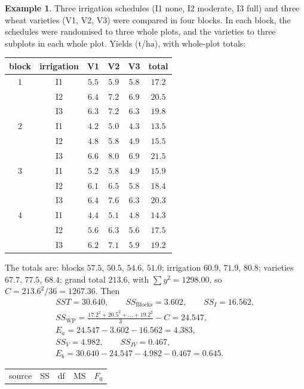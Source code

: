 \documentclass[11pt,a4paper]{article}
\numberwithin{equation}{section}
\theoremstyle{definition}
\newtheorem{exa}[thm]{Example}
\begin{document}
\begin{exa}\label{exa:irrigation}
Three irrigation schedules (I1 none, I2 moderate, I3 full) and three wheat varieties (V1, V2, V3) were compared in four blocks. In each block, the
schedules were randomised to three whole plots, and the varieties to three subplots in each whole plot. Yields (t/ha), with whole-plot totals:
\begin{center}
\begin{tabular}{cc|ccc|c}
block & irrigation & V1 & V2 & V3 & total \\
\hline
$1$ & I1 & $5.5$ & $5.9$ & $5.8$ & $17.2$ \\
& I2 & $6.4$ & $7.2$ & $6.9$ & $20.5$ \\
& I3 & $6.3$ & $7.2$ & $6.3$ & $19.8$ \\
\hline
$2$ & I1 & $4.2$ & $5.0$ & $4.3$ & $13.5$ \\
& I2 & $4.8$ & $5.8$ & $4.9$ & $15.5$ \\
& I3 & $6.6$ & $8.0$ & $6.9$ & $21.5$ \\
\hline
$3$ & I1 & $5.2$ & $5.8$ & $4.9$ & $15.9$ \\
& I2 & $6.1$ & $6.5$ & $5.8$ & $18.4$ \\
& I3 & $6.4$ & $7.6$ & $6.3$ & $20.3$ \\
\hline
$4$ & I1 & $4.4$ & $5.1$ & $4.8$ & $14.3$ \\
& I2 & $5.6$ & $6.3$ & $5.6$ & $17.5$ \\
& I3 & $6.2$ & $7.1$ & $5.9$ & $19.2$
\end{tabular}
\end{center}
The totals are: blocks $57.5$, $50.5$, $54.6$, $51.0$; irrigation $60.9$, $71.9$, $80.8$; varieties $67.7$, $77.5$, $68.4$; grand total $213.6$, with $\sum y^2 = 1298.00$, so
$C = 213.6^2/36 = 1267.36$. Then
\begin{gather*}
SST = 30.640 , \qquad SS_{\mathrm{Blocks}} = 3.602 , \qquad SS_I = 16.562 , \\
SS_{\mathrm{WP}} = \frac{17.2^2 + 20.5^2 + \dots + 19.2^2}3 - C = 24.547 , \\
E_a = 24.547 - 3.602 - 16.562 = 4.383 , \\
SS_V = 4.982 , \qquad SS_{IV} = 0.467 , \\
E_b = 30.640 - 24.547 - 4.982 - 0.467 = 0.645 .
\end{gather*}
\begin{center}
\begin{tabular}{l|cccc}
source & SS & df & MS & $F_0$ \\

\end{tabular}
\end{center}
\end{exa}
\end{document}

